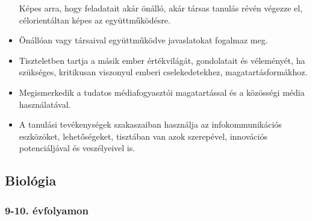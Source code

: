 \begin{itemize}
  Képes arra, hogy feladatait akár önálló, akár társas tanulás révén
  végezze el, célorientáltan képes az együttműködésre.
\item
  Önállóan vagy társaival együttműködve javaslatokat fogalmaz meg.
\item
  Tiszteletben tartja a másik ember értékvilágát, gondolatait és
  véleményét, ha szükséges, kritikusan viszonyul emberi cselekedetekhez,
  magatartásformákhoz.
\item
  Megismerkedik a tudatos médiafogyasztói magatartással és a közösségi
  média használatával.
\item
  A tanulási tevékenységek szakaszaiban használja az infokommunikációs
  eszközöket, lehetőségeket, tisztában van azok szerepével, innovációs
  potenciáljával és veszélyeivel is.
\end{itemize}

\hypertarget{biologia}{%
\subsection{Biológia}\label{biologia}}

\hypertarget{evfolyamon-2}{%
\subsubsection{9-10. évfolyamon}\label{evfolyamon-2}}

